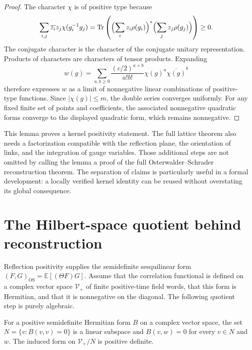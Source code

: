 \begin{proof}
The character $\chi$ is of positive type because
\[
 \sum_{i,j}\overline{z_i}z_j\chi(g_i^{-1}g_j)
 =\operatorname{Tr}\left(
  \Bigl(\sum_i z_i\rho(g_i)\Bigr)^*
  \Bigl(\sum_j z_j\rho(g_j)\Bigr)\right)\geq0.
\]
The conjugate character is the character of the conjugate unitary
representation.  Products of characters are characters of tensor products.
Expanding
\[
 w(g)=\sum_{a,b\geq0}\frac{(c/2)^{a+b}}{a!b!}
                  \chi(g)^a\overline{\chi(g)}^{b}
\]
therefore expresses $w$ as a limit of nonnegative linear combinations of
positive-type functions.  Since $|\chi(g)|\leq m$, the double series
converges uniformly.  For any fixed finite set of points and coefficients,
the associated nonnegative quadratic forms converge to the displayed
quadratic form, which remains nonnegative.
\end{proof}

This lemma proves a kernel positivity statement.  The full lattice theorem
also needs a factorization compatible with the reflection plane, the
orientation of links, and the integration of gauge variables.  Those
additional steps are not omitted by calling the lemma a proof of the full
Osterwalder--Schrader reconstruction theorem.  The separation of claims is
particularly useful in a formal development: a locally verified kernel
identity can be reused without overstating its global consequence.

\section{The Hilbert-space quotient behind reconstruction}

Reflection positivity supplies the semidefinite sesquilinear form
$(F,G)_{\mathrm{OS}}=\mathbb E[(\Theta F)G]$.
Assume that the correlation functional is defined on a complex vector
space $\mathcal V_+$ of finite positive-time field words, that this form
is Hermitian, and that it is nonnegative on the diagonal.  The following
quotient step is purely algebraic.

\begin{proposition}
For a positive semidefinite Hermitian form $B$ on a complex vector space,
the set $N=\{v:B(v,v)=0\}$ is a linear subspace and
$B(v,w)=0$ for every $v\in N$ and $w$.  The induced form on
$\mathcal V_+/N$ is positive definite.
\end{proposition}

